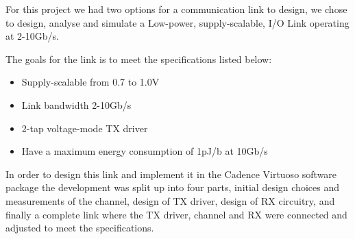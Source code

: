 For this project we had two options for a communication link to design, we chose to design, analyse and simulate a Low-power, supply-scalable, I/O Link operating at 2-10Gb/s.

The goals for the link is to meet the specifications listed below:

\begin{itemize}
\item Supply-scalable from 0.7 to 1.0V
\item Link bandwidth 2-10Gb/s
\item 2-tap voltage-mode TX driver
\item Have a maximum energy consumption of 1pJ/b at 10Gb/s
\end{itemize}

In order to design this link and implement it in the Cadence Virtuoso software package the development was split up into four parts, initial design choices and measurements of the channel, design of TX driver, design of RX circuitry, and finally a complete link where the TX driver, channel and RX were connected and adjusted to meet the specifications.
